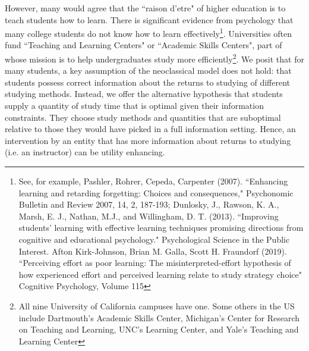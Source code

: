 \documentclass[12pt]{article}
\begin{document}
However, many would agree that the ``raison d'etre" of higher education is to teach students how to learn. There is significant evidence from psychology that many college students do not know how to learn effectively\footnote{See, for example, Pashler, Rohrer, Cepeda, Carpenter (2007). ``Enhancing learning and retarding forgetting: Choices and consequences," Psychonomic Bulletin and Review 2007, 14, 2, 187-193; Dunlosky, J., Rawson, K. A., Marsh, E. J., Nathan, M.J., and Willingham, D. T. (2013). ``Improving students’ learning with effective learning techniques promising directions from cognitive and educational psychology." Psychological Science in the Public Interest. Afton Kirk-Johnson, Brian M. Galla, Scott H. Fraundorf (2019). ``Perceiving effort as poor learning: The misinterpreted-effort hypothesis of how experienced effort and perceived learning relate to study strategy choice" Cognitive Psychology, Volume 115}. Universities often fund  ``Teaching and Learning Centers" or ``Academic Skills Centers", part of whose mission is to help undergraduates study more efficiently\footnote{All nine University of California campuses have one. Some others in the US include Dartmouth's Academic Skills Center, Michigan's Center for Research on Teaching and Learning, UNC's Learning Center, and Yale's Teaching and Learning Center}. We posit that for many students, a key assumption of the neoclassical model does not hold: that students possess correct information about the returns to studying of different studying methods. Instead, we offer the alternative hypothesis that students supply a quantity of study time that is optimal given their information constraints. They choose study methods and quantities that are suboptimal relative to those they would have picked in a full information setting. Hence, an intervention by an entity that has more information about returns to studying (i.e. an instructor) can be utility enhancing. 


\end{document}
